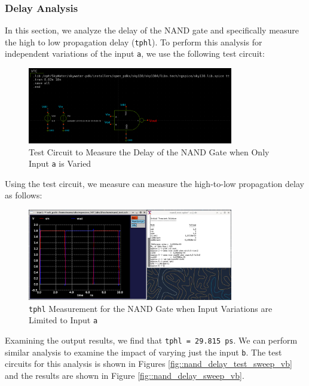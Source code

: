 \documentclass[fleqn]{article}
\begin{document}
	\subsubsection{Delay Analysis}
	
	In this section, we analyze the delay of the NAND gate and specifically measure the high to low propagation delay (\texttt{tphl}). To perform this analysis for independent variations of the input \texttt{a}, we use the following test circuit:
	
	\begin{figure}[H]
		\centerline{\includegraphics[width=0.8\textwidth]{nand_delay_test_sweep_va.png}}
		\caption{Test Circuit to Measure the Delay of the NAND Gate when Only Input \texttt{a} is Varied}
		\label{fig::nand_delay_test_sweep_va}
	\end{figure}
	
	Using the test circuit, we measure can measure the high-to-low propagation delay as follows:
	
	\begin{figure}[H]
		\centerline{\includegraphics[width=0.8\textwidth]{nand_delay_sweep_va.png}}
		\caption{\texttt{tphl} Measurement for the NAND Gate when Input Variations are Limited to Input \texttt{a}}
		\label{fig::nand_delay_sweep_va}
	\end{figure}
	
	Examining the output results, we find that \texttt{tphl = 29.815 ps}. We can perform similar analysis to examine the impact of varying just the input \texttt{b}. The test circuits for this analysis is shown in Figures \ref{fig::nand_delay_test_sweep_vb} and the results are shown in Figure \ref{fig::nand_delay_sweep_vb}.
	
\end{document}
